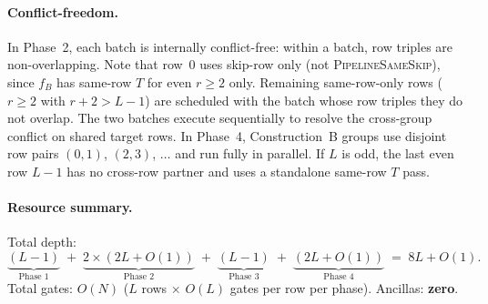\paragraph{Conflict-freedom.}
In Phase~2, each batch is internally conflict-free: within a batch, row triples are non-overlapping.
Note that row~$0$ uses skip-row only (not \textsc{PipelineSameSkip}), since $f_B$ has same-row $T$ for even $r \ge 2$ only.
Remaining same-row-only rows ($r \ge 2$ with $r{+}2 > L{-}1$) are scheduled with the batch whose row triples they do not overlap.
The two batches execute sequentially to resolve the cross-group conflict on shared target rows.
In Phase~4, Construction~B groups use disjoint row pairs $(0,1)$, $(2,3)$, $\ldots$ and run fully in parallel.
If $L$ is odd, the last even row $L{-}1$ has no cross-row partner and uses a standalone same-row $T$ pass.

\paragraph{Resource summary.}
Total depth:
\[
\underbrace{(L{-}1)}_{\text{Phase 1}}
\;+\; \underbrace{2 \times (2L{+}O(1))}_{\text{Phase 2}}
\;+\; \underbrace{(L{-}1)}_{\text{Phase 3}}
\;+\; \underbrace{(2L{+}O(1))}_{\text{Phase 4}}
\;=\; 8L + O(1).
\]
Total gates: $O(N)$ ($L$ rows $\times$ $O(L)$ gates per row per phase).
Ancillas: \textbf{zero}.


